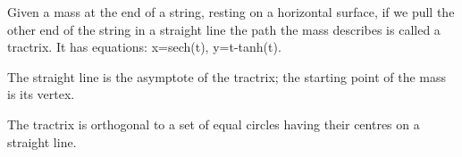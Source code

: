 Given a mass at the end of a string, resting on a horizontal
surface, if we pull the other end of the string in a straight
line the path the mass describes is called a tractrix.
It has equations: x=sech(t), y=t-tanh(t).
\par
The straight line is the asymptote of the tractrix; the
starting point of the mass is its vertex.
\par
The tractrix is orthogonal to a set of equal circles
having their centres on a straight line.
